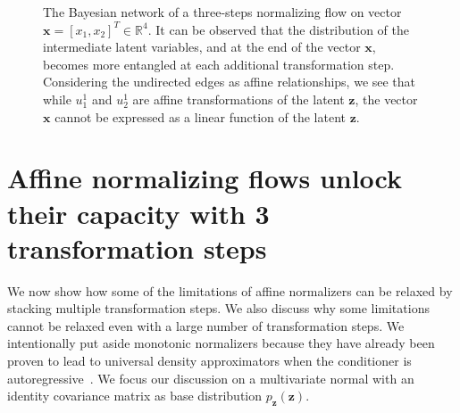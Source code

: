 \begin{figure}
    \centering
     \caption{The Bayesian network of a three-steps normalizing flow on vector $\mathbf{x} = [x_1, x_2]^T \in \mathbb{R}^4$. It can be observed that the distribution of the intermediate latent variables, and at the end of the vector $\mathbf{x}$, becomes more entangled at each additional transformation step. Considering the undirected edges as affine relationships, we see that while $u_1^1$ and $u_2^1$ are affine transformations of the latent $\mathbf{z}$, the vector $\mathbf{x}$ cannot be expressed as a linear function of the latent $\mathbf{z}$.}
     \label{fig:2d-three-steps-flows}
\end{figure}


\section{Affine normalizing flows unlock their capacity with 3 transformation steps}

We now show how some of the limitations of affine normalizers can be relaxed by stacking multiple transformation steps.
We also discuss why some limitations cannot be relaxed even with a large number of transformation steps. We intentionally put aside monotonic normalizers because they have already been proven to lead to universal density approximators when the conditioner is autoregressive~\cite{huang_neural_2018}.
We focus our discussion on a multivariate normal with an identity covariance matrix as base distribution $p_{\mathbf{z}}(\mathbf{z})$. %

